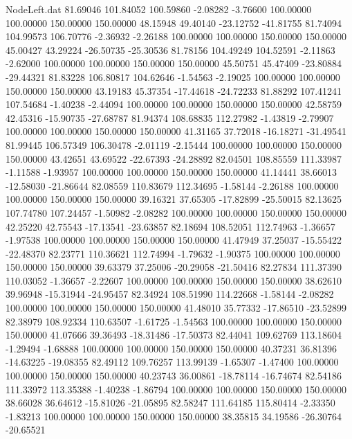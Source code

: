 \begin{filecontents}{NodeLeft.dat}
  81.69046  101.84052  100.59860    -2.08282   -3.76600  100.00000  100.00000  150.00000  150.00000   48.15948   49.40140  -23.12752  -41.81755
  81.74094  104.99573  106.70776    -2.36932   -2.26188  100.00000  100.00000  150.00000  150.00000   45.00427   43.29224  -26.50735  -25.30536
  81.78156  104.49249  104.52591    -2.11863   -2.62000  100.00000  100.00000  150.00000  150.00000   45.50751   45.47409  -23.80884  -29.44321
  81.83228  106.80817  104.62646    -1.54563   -2.19025  100.00000  100.00000  150.00000  150.00000   43.19183   45.37354  -17.44618  -24.72233
  81.88292  107.41241  107.54684    -1.40238   -2.44094  100.00000  100.00000  150.00000  150.00000   42.58759   42.45316  -15.90735  -27.68787
  81.94374  108.68835  112.27982    -1.43819   -2.79907  100.00000  100.00000  150.00000  150.00000   41.31165   37.72018  -16.18271  -31.49541
  81.99445  106.57349  106.30478    -2.01119   -2.15444  100.00000  100.00000  150.00000  150.00000   43.42651   43.69522  -22.67393  -24.28892
  82.04501  108.85559  111.33987    -1.11588   -1.93957  100.00000  100.00000  150.00000  150.00000   41.14441   38.66013  -12.58030  -21.86644
  82.08559  110.83679  112.34695    -1.58144   -2.26188  100.00000  100.00000  150.00000  150.00000   39.16321   37.65305  -17.82899  -25.50015
  82.13625  107.74780  107.24457    -1.50982   -2.08282  100.00000  100.00000  150.00000  150.00000   42.25220   42.75543  -17.13541  -23.63857
  82.18694  108.52051  112.74963    -1.36657   -1.97538  100.00000  100.00000  150.00000  150.00000   41.47949   37.25037  -15.55422  -22.48370
  82.23771  110.36621  112.74994    -1.79632   -1.90375  100.00000  100.00000  150.00000  150.00000   39.63379   37.25006  -20.29058  -21.50416
  82.27834  111.37390  110.03052    -1.36657   -2.22607  100.00000  100.00000  150.00000  150.00000   38.62610   39.96948  -15.31944  -24.95457
  82.34924  108.51990  114.22668    -1.58144   -2.08282  100.00000  100.00000  150.00000  150.00000   41.48010   35.77332  -17.86510  -23.52899
  82.38979  108.92334  110.63507    -1.61725   -1.54563  100.00000  100.00000  150.00000  150.00000   41.07666   39.36493  -18.31486  -17.50373
  82.44041  109.62769  113.18604    -1.29494   -1.68888  100.00000  100.00000  150.00000  150.00000   40.37231   36.81396  -14.63225  -19.08355
  82.49112  109.76257  113.99139    -1.65307   -1.47400  100.00000  100.00000  150.00000  150.00000   40.23743   36.00861  -18.78114  -16.74674
  82.54186  111.33972  113.35388    -1.40238   -1.86794  100.00000  100.00000  150.00000  150.00000   38.66028   36.64612  -15.81026  -21.05895
  82.58247  111.64185  115.80414    -2.33350   -1.83213  100.00000  100.00000  150.00000  150.00000   38.35815   34.19586  -26.30764  -20.65521

\end{filecontents}
